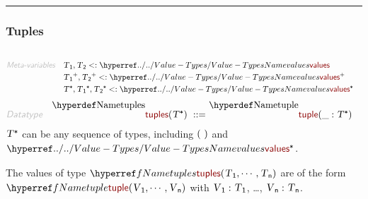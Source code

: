 

\begin{center}
\rule{3in}{0.4pt}
\end{center}

\subsubsection{Tuples}\hypertarget{tuples}{}\label{tuples}

\begin{align*}
  [ \
  \KEY{Datatype} \quad & \NAMEREF{tuples} \\
  \KEY{Funcon} \quad & \NAMEREF{tuple-elements} \\
  \KEY{Funcon} \quad & \NAMEREF{tuple-zip}
  \ ]
\end{align*}
\begin{align*}
  \KEY{Meta-variables} \quad
  & \VAR{T}\SUB{1}, \VAR{T}\SUB{2} <: \NAMEHYPER{../..}{Value-Types}{values} \qquad \\& \VAR{T}\SUB{1}\PLUS, \VAR{T}\SUB{2}\PLUS <: \NAMEHYPER{../..}{Value-Types}{values}\PLUS \qquad \\& \VAR{T}\STAR, \VAR{T}\SUB{1}\STAR, \VAR{T}\SUB{2}\STAR <: \NAMEHYPER{../..}{Value-Types}{values}\STAR
\end{align*}
\begin{align*}
  \KEY{Datatype} \quad 
  \NAMEDECL{tuples}(
                     \VAR{T}\STAR ) 
  \ ::= \ & \NAMEDECL{tuple}(
                               \_ : \VAR{T}\STAR)
\end{align*}
$\SHADE{\VAR{T}\STAR}$ can be any sequence of types, including $\strut(   \  )\strut$ and $\SHADE{\NAMEHYPER{../..}{Value-Types}{values}\STAR}$.

The values of type $\SHADE{\NAMEREF{tuples}
           (  \VAR{T}\SUB{1}, 
                  \cdots, 
                  \VAR{T}\SUB{n} )}$ are of the form $\SHADE{\NAMEREF{tuple}
           (  \VAR{V}\SUB{1}, 
                  \cdots, 
                  \VAR{V}\SUB{n} )}$
  with $\SHADE{\VAR{V}\SUB{1} : \VAR{T}\SUB{1}}$, \ldots{}, $\SHADE{\VAR{V}\SUB{n} : \VAR{T}\SUB{n}}$.

